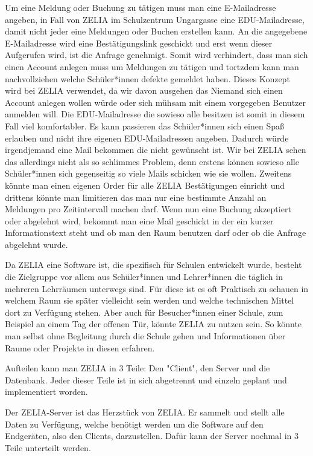 Um eine Meldung oder Buchung zu tätigen muss man eine E-Mailadresse angeben, in Fall von ZELIA im Schulzentrum Ungargasse eine EDU-Mailadresse, damit nicht jeder eine Meldungen oder Buchen erstellen kann. An die angegebene E-Mailadresse wird eine Bestätigungslink geschickt und erst wenn dieser Aufgerufen wird, ist die Anfrage genehmigt. Somit wird verhindert, dass man sich einen Account anlegen muss um Meldungen zu tätigen und tortzdem kann man nachvollziehen welche Schüler*innen defekte gemeldet haben. Dieses Konzept wird bei ZELIA verwendet, da wir davon ausgehen das Niemand sich einen Account anlegen wollen würde oder sich mühsam mit einem vorgegeben Benutzer anmelden will. Die EDU-Mailadresse die sowieso alle besitzen ist somit in diesem Fall viel komfortabler. Es kann passieren das Schüler*innen sich einen Spaß erlauben und nicht ihre eigenen EDU-Mailadressen angeben. Dadurch würde irgendjemand eine Mail bekommen die nicht gewünscht ist. Wir bei ZELIA sehen das allerdings nicht als so schlimmes Problem, denn erstens können sowieso alle Schüler*innen sich gegenseitig so viele Mails schicken wie sie wollen. Zweitens könnte man einen eigenen Order für alle ZELIA Bestätigungen einricht und drittens könnte man limitieren das man nur eine bestimmte Anzahl an Meldungen pro Zeitintervall machen darf. Wenn nun eine Buchung akzeptiert oder abgelehnt wird, bekommt man eine Mail geschickt in der ein kurzer Informationstext steht und ob man den Raum benutzen darf oder ob die Anfrage abgelehnt wurde.

Da ZELIA eine Software ist, die spezifisch für Schulen entwickelt wurde, besteht die Zielgruppe vor allem aus Schüler*innen und Lehrer*innen die täglich in mehreren Lehrräumen unterwegs sind. Für diese ist es oft Praktisch zu schauen in welchem Raum sie später vielleicht sein werden und welche technischen Mittel dort zu Verfügung stehen. Aber auch für Besucher*innen einer Schule, zum Beispiel an einem Tag der offenen Tür, könnte ZELIA zu nutzen sein. So könnte man selbst ohne Begleitung durch die Schule gehen und Informationen über Raume oder Projekte in diesen erfahren.

Aufteilen kann man ZELIA in 3 Teile: Den "Client", den Server und die Datenbank. Jeder dieser Teile ist in sich abgetrennt und einzeln geplant und implementiert worden.


Der ZELIA-Server ist das Herzstück von ZELIA. Er sammelt und stellt alle Daten zu Verfügung, welche benötigt werden um die Software auf den Endgeräten, also den Clients, darzustellen. Dafür kann der Server nochmal in 3 Teile unterteilt werden.

